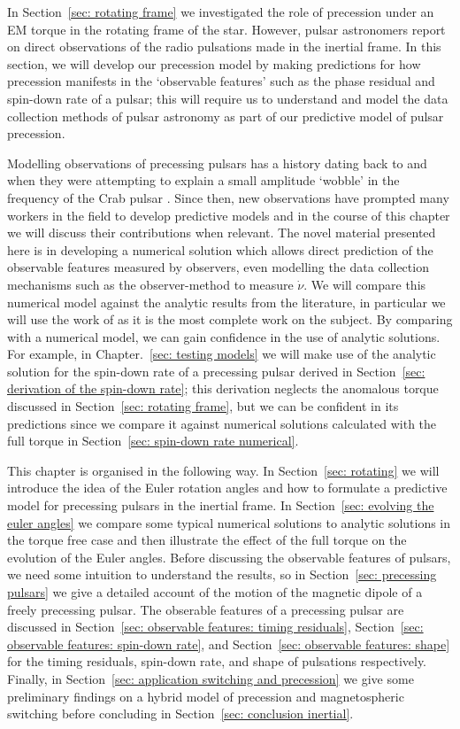 \documentclass[../full_thesis/full_thesis.tex]{subfiles}
\begin{document}
In Section~\ref{sec: rotating frame} we investigated the role of precession under
an EM torque in the rotating frame of the star. However, pulsar astronomers
report on direct observations of the radio pulsations made in the inertial
frame. In this section, we will develop our precession model by making
predictions for how precession manifests in the `observable features' such as
the phase residual and spin-down rate of a pulsar; this will require us to
understand and model the data collection methods of pulsar astronomy as part of
our predictive model of pulsar precession.

Modelling observations of precessing pulsars has a history dating back to
\citet{Ruderman1970} and \citet{chiuderi1970shape} when they were attempting to
explain a small amplitude `wobble' in the frequency of the Crab pulsar
\citep{Richards1969, Richards1969b}. Since then, new observations have prompted
many workers in the field to develop predictive models and in the course of
this chapter we will discuss their contributions when relevant.  The novel
material presented here is in developing a numerical solution which allows
direct prediction of the observable features measured by observers, even
modelling the data collection mechanisms such as the observer-method to measure
$\dot{\nu}$. We will compare this numerical model against the analytic results
from the literature, in particular we will use the work of \citet{Jones2001} as
it is the most complete work on the subject. By comparing with a numerical
model, we can gain confidence in the use of analytic solutions. For example, in
Chapter.~\ref{sec: testing models} we will make use of the analytic solution
for the spin-down rate of a precessing pulsar derived in Section~\ref{sec:
derivation of the spin-down rate}; this derivation neglects the anomalous
torque discussed in Section~\ref{sec: rotating frame}, but we can be confident in
its predictions since we compare it against numerical solutions calculated with
the full torque in Section~\ref{sec: spin-down rate numerical}.

This chapter is organised in the following way. In Section~\ref{sec: rotating} we
will introduce the idea of the Euler rotation angles and how to formulate a
predictive model for precessing pulsars in the inertial frame. In
Section~\ref{sec: evolving the euler angles} we compare some typical numerical
solutions to analytic solutions in the torque free case and then illustrate the
effect of the full \citet{Deutsch1955} torque on the evolution of the Euler
angles. Before discussing the observable features of pulsars, we need some
intuition to understand the results, so in Section~\ref{sec: precessing pulsars}
we give a detailed account of the motion of the magnetic dipole of a freely
precessing pulsar. The obserable features of a precessing pulsar are discussed
in Section~\ref{sec: observable features: timing residuals}, Section~\ref{sec:
observable features: spin-down rate}, and Section~\ref{sec: observable features:
shape} for the timing residuals, spin-down rate, and shape of pulsations
respectively. Finally, in Section~\ref{sec: application switching and precession}
we give some preliminary findings on a hybrid model of precession and
magnetospheric switching before concluding in Section~\ref{sec: conclusion
inertial}.
\end{document}
